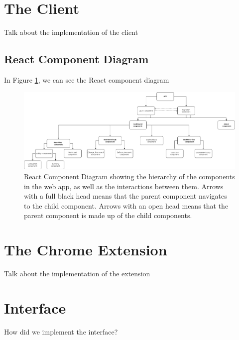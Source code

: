 \documentclass{l4proj}
\begin{document}
\section{The Client}
Talk about the implementation of the client

\subsection{React Component Diagram}
In Figure \ref{fig:react}, we can see the React component diagram
\begin{figure}
    \centering
    \includegraphics[width=1\linewidth]{images/react_comp_diagram.png}    

    \caption{React Component Diagram showing the hierarchy of the components in the web app, as well as the interactions between them. Arrows with a full black head means that the parent component navigates to the child component. Arrows with an open head means that the parent component is made up of the child components.}

    \label{fig:react} 
\end{figure}

\subsection{}

\section{The Chrome Extension}
Talk about the implementation of the extension

\section{Interface}
How did we implement the interface?
\end{document}
